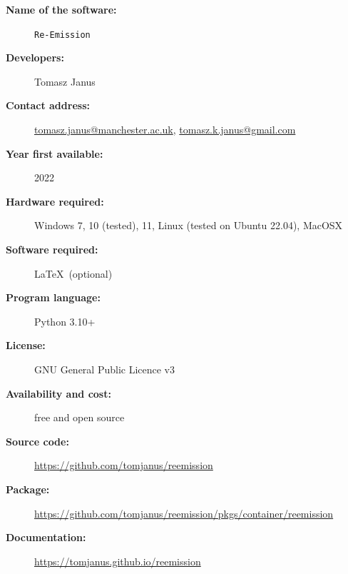 \documentclass[review, authoryear, 1p]{elsarticle} %
\begin{document}
\begin{description}
  \item[\textbf{Name of the software:}] \texttt{Re-Emission}
  \item[\textbf{Developers:}] Tomasz Janus
  \item[\textbf{Contact address:}] \href{mailto:tomasz.janus@manchester.ac.uk}{tomasz.janus@manchester.ac.uk}, \href{mailto:tomasz.k.janus@gmail.com}{tomasz.k.janus@gmail.com}
  \item[\textbf{Year first available:}] 2022
  \item[\textbf{Hardware required:}] Windows 7, 10 (tested), 11, Linux (tested on Ubuntu 22.04), MacOSX
  \item[\textbf{Software required:}] \LaTeX \, (optional)
  \item[\textbf{Program language:}] Python 3.10+
  \item[\textbf{License:}] GNU General Public Licence v3
  \item[\textbf{Availability and cost:}] free and open source
  \item[\textbf{Source code:}] \href{https://github.com/tomjanus/reemission}{https://github.com/tomjanus/reemission} %
  \item[\textbf{Package:}] \href{https://github.com/tomjanus/reemission/pkgs/container/reemission}{https://github.com/tomjanus/reemission/pkgs/container/reemission}
  \item[\textbf{Documentation:}] \href{https://tomjanus.github.io/reemission}{https://tomjanus.github.io/reemission}
\end{description}

\vspace{3pt}
\end{document}
